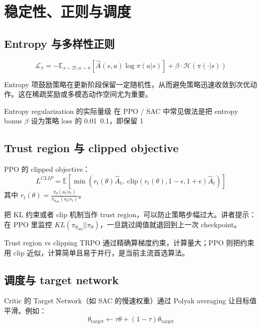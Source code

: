 \section{稳定性、正则与调度}

\subsection{Entropy 与多样性正则}

\begin{equation*}
\mathcal{L}_\pi = -\mathbb{E}_{s \sim \mathcal{D}, a \sim \pi} \left[\hat{A}(s,a)\log \pi(a|s)\right] + \beta \cdot \mathcal{H}(\pi(\cdot|s))
\end{equation*}

Entropy 项鼓励策略在更新阶段保留一定随机性，从而避免策略迅速收敛到次优动作。这在稀疏奖励或多模态动作空间尤为重要。

\begin{importantbox}{Entropy regularization 的实际量级}
在 PPO / SAC 中常见做法是把 entropy bonus $\beta$ 设为策略 loss 的 0.01~0.1，即保留 1%
\end{importantbox}

\subsection{Trust region 与 clipped objective}

PPO 的 clipped objective：
$${L}^{CLIP} = \mathbb{E} \left[ \min\left( r_t(\theta)\hat{A}_t, \; \text{clip}(r_t(\theta), 1-\epsilon, 1+\epsilon)\hat{A}_t \right) \right]$$
其中 $r_t(\theta) = \frac{\pi_\theta(a_t|s_t)}{\pi_{\theta_{\text{old}}}(a_t|s_t)}$。

把 KL 约束或者 clip 机制当作 trust region，可以防止策略步幅过大。讲者提示：在 PPO 里监控 $KL(\pi_{\theta_{\text{old}}}||\pi_\theta)$，一旦跳过阈值就退回到上一次 checkpoint。

\begin{knowledgebox}{Trust region vs clipping}
TRPO 通过精确算梯度约束，计算量大；PPO 则把约束用 clip 近似，计算简单且易于并行，是当前主流首选算法。
\end{knowledgebox}

\subsection{调度与 target network}

Critic 的 Target Network（如 SAC 的慢速权重）通过 Polyak averaging 让目标值平滑。例如：
$$\theta_{\text{target}} \leftarrow \tau \theta + (1 - \tau) \theta_{\text{target}}$$

